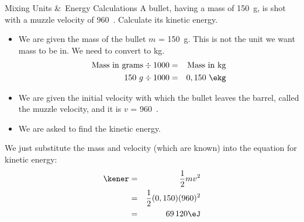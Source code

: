 \begin{wex}{Mixing Units \&\ Energy Calculations }{A bullet, having a mass of 150~g, is shot with a muzzle velocity of 960~\ms. Calculate its kinetic energy.}
{
\begin{itemize}
\item We are given the mass of the bullet $m$ = 150~g. This is not the
unit we want mass to be in. We need to convert to kg.
\begin{eqnarray*}
\rm{Mass~in~grams} \div 1000 &=& \rm{Mass~in~kg}\\
150~g \div 1000 &=& 0,150~\ekg
\end{eqnarray*}

\item We are given the initial velocity with which the bullet leaves the barrel, called the muzzle velocity, and it is $v$ = 960~\ms.
\end{itemize}
\begin{itemize}
\item We are asked to find the kinetic energy.
\end{itemize}

We just substitute the mass and velocity (which are known) into the equation for kinetic energy:
\begin{eqnarray*}
\kener & = & \frac{1}{2}mv^2 \\
&= & \frac{1}{2}(0,150)(960)^2 \\
&=& 69\,120\eJ
\end{eqnarray*}}
\end{wex}


